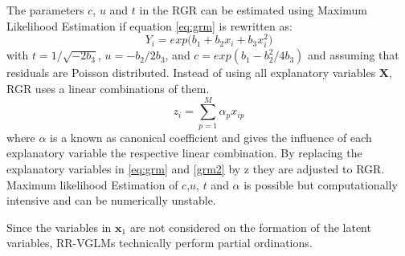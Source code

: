  \noindent The parameters $c$, $u$ and $t$ in the RGR can be estimated using Maximum Likelihood Estimation if equation \ref{eq:grm} is rewritten as: 
 \begin{equation}\label{grm2}
 Y_i = exp \bigg( b_1 + b_2x_i + b_3x_i^2 \bigg)
 \end{equation}
 with $t = 1/\sqrt{-2b_3}$, $ u = -b_2/2b_3$, and $c = exp(b_1-b_2^2/4b_3)$ and assuming that residuals are Poisson distributed. Instead of using all explanatory variables $\mathbf{X}$, RGR uses a linear combinations of them. 
 \begin{equation}\label{RGR1}
 z_i = \sum_{p=1}^M \alpha_p x_{ip}
 \end{equation}     
 where $\alpha$ is a known as canonical coefficient and gives the influence of each explanatory variable the respective linear combination. By replacing the explanatory variables in \ref{eq:grm} and \ref{grm2} by z they are adjusted to RGR. Maximum likelihood Estimation of $c$,$u$, $t$ and $\alpha$ is possible but computationally intensive and can be numerically unstable. 	
 
 
 Since the variables in $\mathbf{x}_1$ are not considered on the formation of the latent variables, RR-VGLMs technically perform partial ordinations. \\
 
 
 
